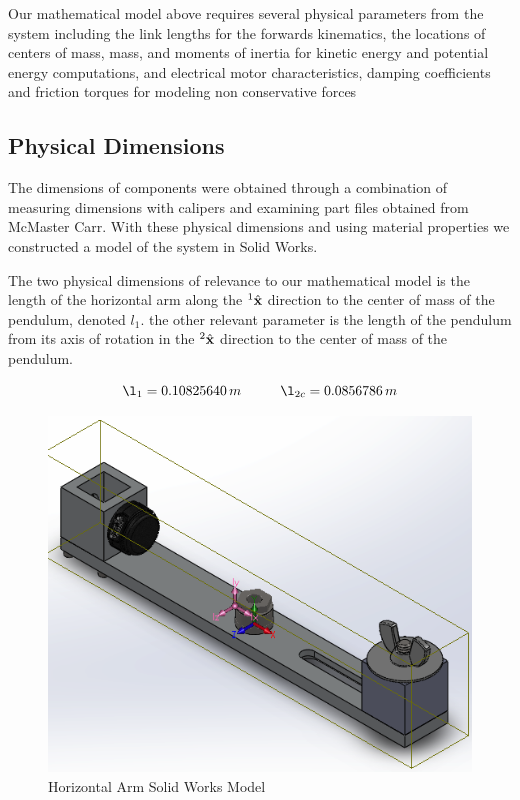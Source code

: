 \documentclass{article}
\theoremstyle{plain}
\theoremstyle{definition}
\theoremstyle{remark}
\begin{document}
Our mathematical model above requires several physical parameters from the system including the link lengths for the forwards kinematics, the locations of centers of mass, mass, and moments of inertia for kinetic energy and potential energy computations, and electrical motor characteristics, damping coefficients and friction torques for modeling non conservative forces 

\subsection*{Physical Dimensions}
The dimensions of components were obtained through a combination of measuring dimensions with calipers and examining part files obtained from McMaster Carr.  With these physical dimensions and using material properties we constructed a model of the system in Solid Works.

The two physical dimensions of relevance to our mathematical model is the length of the horizontal arm along the $^1\hat{\bf{x}}$ direction to the center of mass of the pendulum, denoted $l_1$.  the other relevant parameter is the length of the pendulum from its axis of rotation in the $^2\hat{\bf{x}}$ direction to the center of mass of the pendulum.

$$\l_1 = 0.10825640 \, m \hspace{1cm} \l_{2c} = 0.0856786 \, m$$

\begin{figure}
\begin{center}
\includegraphics[width = 13cm]{CompleteHorizontalArm.png}
\end{center}
\caption{Horizontal Arm Solid Works Model}
\label{ArmCAD}
\end{figure}
\end{document}
